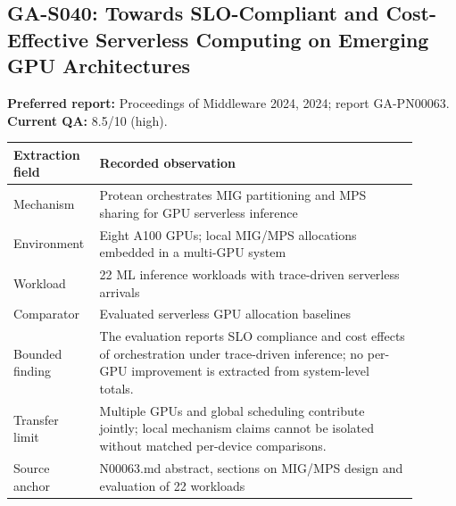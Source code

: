 \subsection{GA-S040: Towards SLO-Compliant and Cost-Effective Serverless Computing on Emerging GPU Architectures}
\textbf{Preferred report:} Proceedings of Middleware 2024, 2024; report GA-PN00063. \textbf{Current QA:} 8.5/10 (high).
\begin{longtable}{P{0.15\linewidth}P{0.75\linewidth}}
\toprule Extraction field & Recorded observation\\\midrule\endhead
Mechanism & Protean orchestrates MIG partitioning and MPS sharing for GPU serverless inference\\
Environment & Eight A100 GPUs; local MIG/MPS allocations embedded in a multi-GPU system\\
Workload & 22 ML inference workloads with trace-driven serverless arrivals\\
Comparator & Evaluated serverless GPU allocation baselines\\
Bounded finding & The evaluation reports SLO compliance and cost effects of orchestration under trace-driven inference; no per-GPU improvement is extracted from system-level totals.\\
Transfer limit & Multiple GPUs and global scheduling contribute jointly; local mechanism claims cannot be isolated without matched per-device comparisons.\\
Source anchor & N00063.md abstract, sections on MIG/MPS design and evaluation of 22 workloads\\
\bottomrule\end{longtable}
